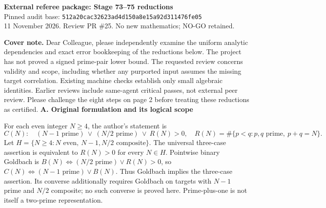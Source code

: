 \documentclass[10pt,a4paper]{article}
\newcommand{\head}[1]{\smallskip\textbf{#1}\par}
\begin{document}
\begin{center}\large\textbf{External referee package: Stage 73--75 reductions}\\
\small Pinned audit base: \texttt{512a20cac32623ad4d150a8e15a92d311476fe05}\\
11 November 2026. Review PR \#25. No new mathematics; NO-GO retained.\end{center}
\textbf{Cover note.} Dear Colleague, please independently examine the uniform analytic dependencies and exact error bookkeeping of the reductions below. The project has not proved a signed prime-pair lower bound. The requested review concerns validity and scope, including whether any purported input assumes the missing target correlation. Existing machine checks establish only small algebraic identities. Earlier reviews include same-agent critical passes, not external peer review. Please challenge the eight steps on page 2 before treating these reductions as certified.
\head{A. Original formulation and its logical scope}
For each even integer $N\ge4$, the author's statement is
\[C(N):\quad (N-1\text{ prime})\ \lor\ (N/2\text{ prime})\ \lor\ R(N)>0,
\quad R(N)=\#\{p<q:p,q\text{ prime},\ p+q=N\}.\]
Let $H=\{N\ge4:N\text{ even},\ N-1,N/2\text{ composite}\}$. The universal three-case assertion is equivalent to $R(N)>0$ for every $N\in H$. Pointwise binary Goldbach is $B(N)\iff(N/2\text{ prime})\lor R(N)>0$, so $C(N)\iff(N-1\text{ prime})\lor B(N)$. Thus Goldbach implies the three-case assertion. Its converse additionally requires Goldbach on targets with $N-1$ prime and $N/2$ composite; no such converse is proved here. Prime-plus-one is not itself a two-prime representation.
\end{document}
